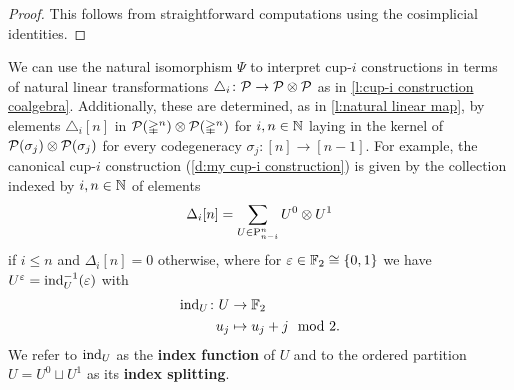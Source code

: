 \begin{proof}
	This follows from straightforward computations using the cosimplicial identities.
\end{proof}

We can use the natural isomorphism $\Psi$ to interpret cup-$i$ constructions in terms of natural linear transformations $\triangle_i \colon \mathcal{P} \to \mathcal{P} \otimes \mathcal{P}$ as in \cref{l:cup-i construction coalgebra}.
Additionally, these are determined, as in \cref{l:natural linear map}, by elements $\triangle_i[n]$ in $\mathcal{P}(\mathbb{\Delta}^n) \otimes \mathcal{P}(\mathbb{\Delta}^n)$ for $i, n \in \mathbb{N}$ laying in the kernel of $\mathcal{P}(\sigma_j) \otimes \mathcal{P}(\sigma_j)$ for every codegeneracy $\sigma_j \colon [n] \to [n-1]$.
For example, the canonical cup-$i$ construction (\cref{d:my cup-i construction}) is given by the collection indexed by $i, n \in \mathbb{N}$ of elements
\[
\Delta_i[n] = \sum_{U \in \mathrm{P}^n_{n-i}} U^0 \otimes U^1
\]
if $i \leq n$ and $\Delta_i[n] = 0$ otherwise, where for $\varepsilon \in {\mathbb{F}_2} \cong \{0,1\}$ we have $U^\varepsilon = \operatorname{ind}_U^{-1}(\varepsilon)$ with
\[
\begin{split}
\operatorname{ind}_U \colon U &\to {\mathbb{F}_2} \\
u_j &\mapsto u_j + j \mod 2.
\end{split}
\]
We refer to $\operatorname{ind}_U$ as the \textbf{index function} of $U$ and to the ordered partition $U = U^0 \sqcup U^1$ as its \textbf{index splitting}.


%
%
%

%
